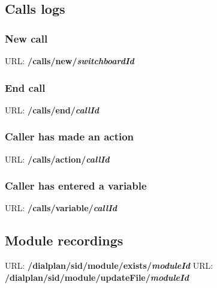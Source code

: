 \subsection{Calls logs}
\subsubsection{New call}
URL: \textbf{/calls/new/{\textit{switchboardId}}}



\subsubsection{End call}
URL: \textbf{/calls/end/{\textit{callId}}}

\subsubsection{Caller has made an action}
URL: \textbf{/calls/action/{\textit{callId}}}

\subsubsection{Caller has entered a variable}
URL: \textbf{/calls/variable/{\textit{callId}}}



\subsection{Module recordings}

URL: \textbf{/dialplan/{sid}/module/exists/{\textit{moduleId}}}
URL: \textbf{/dialplan/{sid}/module/updateFile/{\textit{moduleId}}}



